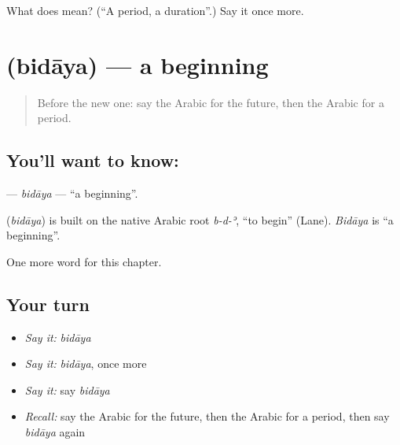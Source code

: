 \begin{tcolorbox}[breakable,colback=teal!4,colframe=teal!35!black,title={Before you move on}]
What does  mean? (\textquotedblleft{}A period, a duration\textquotedblright{}.) Say it once more.
\end{tcolorbox}
\section[\texorpdfstring{\ar{بداية} (bidāya)}{بداية (bidāya)}]{ (bidāya) — a beginning}

\label{lesson:AR-C171-bidaya}



\begin{quote}
Before the new one: say the Arabic for the future, then the Arabic for a period.
\end{quote}

\subsection*{You'll want to know: }
\textbf{} — \emph{bidāya} — \textquotedblleft{}a beginning\textquotedblright{}.

\begin{cousinweb}
\textbf{} (\emph{bidāya}) is built on the native Arabic root \emph{b-d-ʾ}, \textquotedblleft{}to begin\textquotedblright{} (Lane). \emph{Bidāya} is \textquotedblleft{}a beginning\textquotedblright{}.
\end{cousinweb}

\begin{grammarlens}[title={What you've built}]
One more word for this chapter.
\end{grammarlens}

\subsection*{Your turn}
\begin{itemize}
\raggedright
  \item \emph{Say it:} \emph{bidāya}
  \item \emph{Say it:} \emph{bidāya}, once more
  \item \emph{Say it:} say \emph{bidāya}
  \item \emph{Recall:} say the Arabic for the future, then the Arabic for a period, then say \emph{bidāya} again
\end{itemize}

